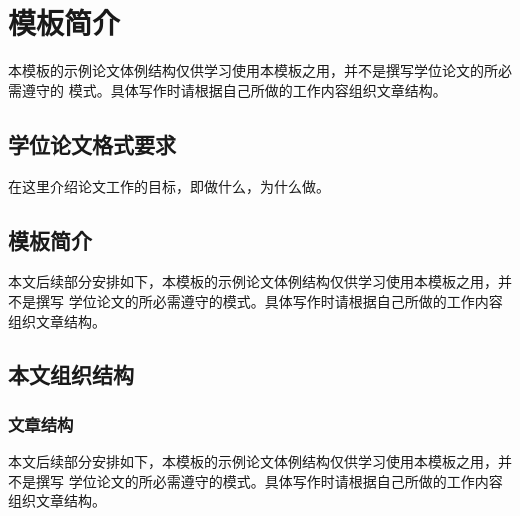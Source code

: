 
\chapter{\texorpdfstring{\XeLaTeX{}}{XeLaTeX}模板简介}
\label{cha:intro}

本模板的示例论文体例结构仅供学习使用本模板之用，并不是撰写学位论文的所必需遵守的
模式。具体写作时请根据自己所做的工作内容组织文章结构。

\section{学位论文格式要求}
\label{sec:motivation}

在这里介绍论文工作的目标，即做什么，为什么做。

\section{\texorpdfstring{\XeLaTeX{}}{XeLaTeX}模板简介}
\label{sec:related-works}

本文后续部分安排如下，本模板的示例论文体例结构仅供学习使用本模板之用，并不是撰写
学位论文的所必需遵守的模式。具体写作时请根据自己所做的工作内容组织文章结构。

\section{本文组织结构}
\label{sec:organization}

\subsection{文章结构}
\label{sec:suborganization}

本文后续部分安排如下，本模板的示例论文体例结构仅供学习使用本模板之用，并不是撰写
学位论文的所必需遵守的模式。具体写作时请根据自己所做的工作内容组织文章结构。


